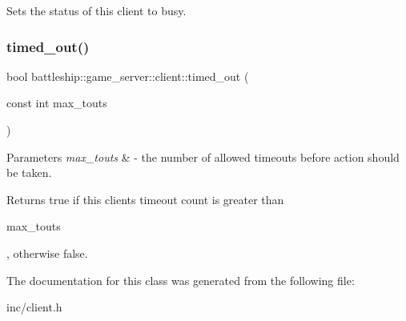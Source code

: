 Sets the status of this client to busy. \mbox{\label{classbattleship_1_1game__server_1_1client_a3975d4198aa55bdf690e2268b3f76080}} 
\subsubsection{\texorpdfstring{timed\+\_\+out()}{timed\_out()}}
{\footnotesize\ttfamily bool battleship\+::game\+\_\+server\+::client\+::timed\+\_\+out (\begin{DoxyParamCaption}\item[{const int}]{max\+\_\+touts }\end{DoxyParamCaption})\hspace{0.3cm}{\ttfamily [inline]}}


\begin{DoxyParams}{Parameters}
{\em max\+\_\+touts} & -\/ the number of allowed timeouts before action should be taken. \\
\hline
\end{DoxyParams}
\begin{DoxyReturn}{Returns}
true if this client\textquotesingle{}s timeout count is greater than 
\begin{DoxyCode}
max\_touts 
\end{DoxyCode}
 , otherwise false. 
\end{DoxyReturn}


The documentation for this class was generated from the following file\+:\begin{DoxyCompactItemize}
\item 
inc/client.\+h\end{DoxyCompactItemize}

